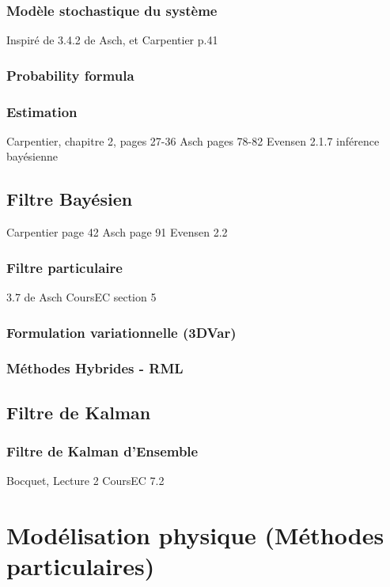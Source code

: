 \documentclass{article}
\begin{document}
\subsubsection{Modèle stochastique du système}

Inspiré de 3.4.2 de Asch, et Carpentier p.41
\subsubsection{Probability formula}

\subsubsection{Estimation}

Carpentier, chapitre 2, pages 27-36
Asch pages 78-82
Evensen 2.1.7 inférence bayésienne
\subsection{Filtre Bayésien}

Carpentier page 42
Asch page 91
Evensen 2.2
\subsubsection{Filtre particulaire}

3.7 de Asch
CoursEC section 5
\subsubsection{Formulation variationnelle (3DVar)}

\subsubsection{Méthodes Hybrides - RML}

\subsection{Filtre de Kalman}

\subsubsection{Filtre de Kalman d'Ensemble}

Bocquet, Lecture 2
CoursEC 7.2

\section{Modélisation physique (Méthodes particulaires)}
\end{document}
